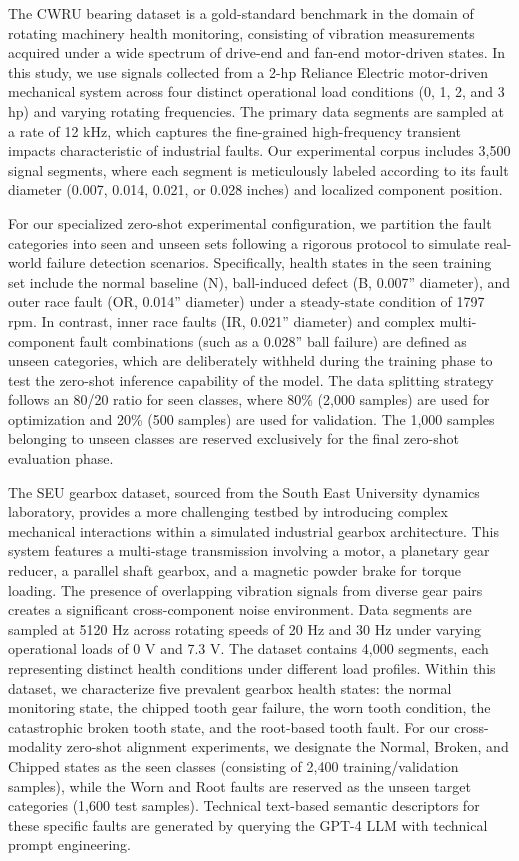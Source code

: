 \documentclass[journal]{IEEEtran}
\begin{document}


The CWRU bearing dataset is a gold-standard benchmark in the domain of rotating machinery health monitoring, consisting of vibration measurements acquired under a wide spectrum of drive-end and fan-end motor-driven states. In this study, we use signals collected from a 2-hp Reliance Electric motor-driven mechanical system across four distinct operational load conditions (0, 1, 2, and 3 hp) and varying rotating frequencies. The primary data segments are sampled at a rate of 12 kHz, which captures the fine-grained high-frequency transient impacts characteristic of industrial faults. Our experimental corpus includes 3,500 signal segments, where each segment is meticulously labeled according to its fault diameter (0.007, 0.014, 0.021, or 0.028 inches) and localized component position.

For our specialized zero-shot experimental configuration, we partition the fault categories into seen and unseen sets following a rigorous protocol to simulate real-world failure detection scenarios. Specifically, health states in the seen training set include the normal baseline (N), ball-induced defect (B, 0.007'' diameter), and outer race fault (OR, 0.014'' diameter) under a steady-state condition of 1797 rpm. In contrast, inner race faults (IR, 0.021'' diameter) and complex multi-component fault combinations (such as a 0.028'' ball failure) are defined as unseen categories, which are deliberately withheld during the training phase to test the zero-shot inference capability of the model. The data splitting strategy follows an 80/20 ratio for seen classes, where 80\% (2,000 samples) are used for optimization and 20\% (500 samples) are used for validation. The 1,000 samples belonging to unseen classes are reserved exclusively for the final zero-shot evaluation phase.

The SEU gearbox dataset, sourced from the South East University dynamics laboratory, provides a more challenging testbed by introducing complex mechanical interactions within a simulated industrial gearbox architecture. This system features a multi-stage transmission involving a motor, a planetary gear reducer, a parallel shaft gearbox, and a magnetic powder brake for torque loading. The presence of overlapping vibration signals from diverse gear pairs creates a significant cross-component noise environment. Data segments are sampled at 5120 Hz across rotating speeds of 20 Hz and 30 Hz under varying operational loads of 0 V and 7.3 V. The dataset contains 4,000 segments, each representing distinct health conditions under different load profiles. Within this dataset, we characterize five prevalent gearbox health states: the normal monitoring state, the chipped tooth gear failure, the worn tooth condition, the catastrophic broken tooth state, and the root-based tooth fault. For our cross-modality zero-shot alignment experiments, we designate the Normal, Broken, and Chipped states as the seen classes (consisting of 2,400 training/validation samples), while the Worn and Root faults are reserved as the unseen target categories (1,600 test samples). Technical text-based semantic descriptors for these specific faults are generated by querying the GPT-4 LLM with technical prompt engineering.
\end{document}
